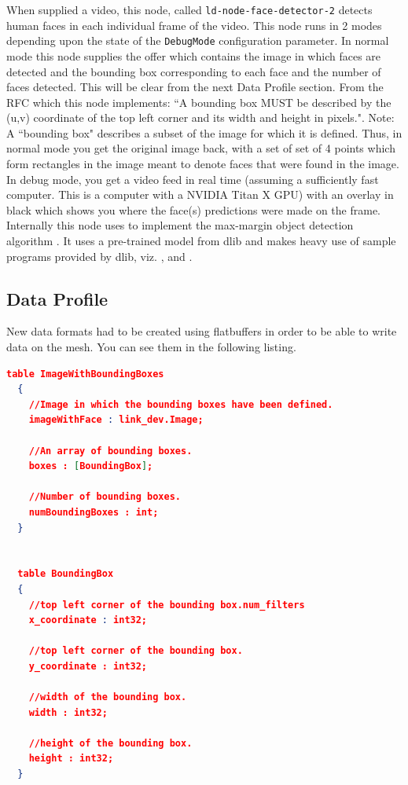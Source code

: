 \documentclass[a4paper, 12pt, oneside]{report}
\begin{document}
  When supplied a video, this node, called \texttt{ld-node-face-detector-2}  \cite{NumericalAdvantageldnodefacedetector2ALink2nodetodetectfacesinastreamofvideo-2020-02-20} detects human faces in each individual frame of the video. This node runs in 2 modes depending upon the state of the \texttt{DebugMode} configuration parameter. In normal mode this node supplies the offer which contains the image in which faces are detected and the bounding box corresponding to each face and the number of faces detected. This will be clear from the next Data Profile section.
  From the RFC which this node implements: ``A bounding box MUST be described by the (u,v) coordinate of the top left corner and its width and height in pixels.". Note: A ``bounding box" describes a subset of the image for which it is defined. 
  Thus, in normal mode you get the original image back, with a set of set of 4 points which form rectangles in the image meant to denote faces that were found in the image.
  In debug mode, you get a video feed in real time (assuming a sufficiently fast computer. This is a computer with a NVIDIA Titan X GPU) with an overlay in black which shows you where the face(s) predictions were made on the frame.
  Internally this node uses \cite{dlibCLibrary-2020-02-12} to implement the max-margin object detection algorithm \cite{king2015max}. It uses a pre-trained model \cite{dlibCLibrarydnnmmodfacedetectionexcpp-2019-12-14} from dlib and makes heavy use of sample programs provided by dlib, viz. \cite{dlibCLibrarydnnmmodfacedetectionexcpp-2019-12-14}, \cite{dlibCLibraryfacedetectionexcpp-2019-12-14} and \cite{dlibCLibrarydnnintroduction2excpp-2019-12-14}.
  
  \subsection{Data Profile}
  
  New data formats had to be created using flatbuffers \cite{FlatBuffersFlatBuffers-2019-06-20} in order to be able to write data on the mesh. You can see them in the following listing.
  
  \begin{lstlisting}[language=json,firstnumber=1]
  table ImageWithBoundingBoxes
  {
    //Image in which the bounding boxes have been defined.
    imageWithFace : link_dev.Image;  
    
    //An array of bounding boxes. 
    boxes : [BoundingBox]; 
    
    //Number of bounding boxes.          
    numBoundingBoxes : int;
  }
  
  
  table BoundingBox
  {
    //top left corner of the bounding box.num_filters
    x_coordinate : int32; 
    
    //top left corner of the bounding box.
    y_coordinate : int32; 
    
    //width of the bounding box.
    width : int32;        
    
    //height of the bounding box.
    height : int32;
  }
  \end{lstlisting}
  
\end{document}
